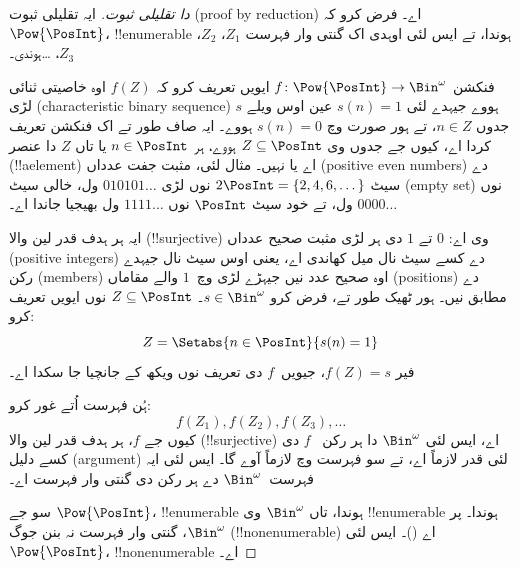 \documentclass[../../../include/open-logic-section]{subfiles}
\begin{document}
\begin{proof}[{} دا تقلیلی ثبوت]
ایہ تقلیلی ثبوت (proof by reduction) اے۔ فرض کرو کہ
$\Pow{\PosInt}$، !!{enumerable} ہوندا، تے ایس لئی اوہدی اک
گنتی وار فہرست $Z_{1}$، $Z_{2}$، $Z_{3}$، \dots ہوندی۔

فنکشن $f \colon \Pow{\PosInt} \to \Bin^\omega$ ایویں تعریف کرو کہ
$f(Z)$ اوہ خاصیتی ثنائی لڑی (characteristic binary sequence) $s$ ہووے
جیہدے لئی $s(n) = 1$ عین اوس ویلے جدوں
$n \in Z$، تے ہور صورت وچ $s(n) = 0$ ہووے۔
ایہ صاف طور تے اک فنکشن تعریف کردا اے، کیوں جے جدوں وی
$Z \subseteq \PosInt$ ہووے، ہر $n \in \PosInt$ یا تاں $Z$ دا
عنصر (!!a{element}) اے یا نہیں۔ مثال لئی، مثبت جفت عدداں (positive
even numbers) دے سیٹ
$2\PosInt = \{2, 4, 6, \dots\}$ نوں لڑی $010101\dots$ ول، خالی سیٹ
(empty set)
نوں $0000\dots$ ول، تے خود سیٹ $\PosInt$ نوں $1111\dots$ ول بھیجیا
جاندا اے۔

ایہ ہر ہدف قدر لین والا (!!{surjective}) وی اے: $0$ تے $1$ دی ہر لڑی
مثبت صحیح عدداں (positive integers) دے کسے سیٹ نال میل کھاندی اے،
یعنی اوس سیٹ نال جیہدے رکن (members) اوہ صحیح عدد نیں جیہڑے لڑی
وچ~$1$ والے مقاماں (positions) دے مطابق نیں۔ ہور ٹھیک طور تے،
فرض کرو $s \in \Bin^\omega$۔ $Z \subseteq \PosInt$ نوں ایویں تعریف کرو:
\[
Z = \Setabs{n \in \PosInt}{s(n) = 1}
\]
فیر $f(Z) = s$، جیویں~$f$ دی تعریف نوں ویکھ کے جانچیا جا سکدا اے۔

ہُن فہرست اُتے غور کرو:
\[
f(Z_1), f(Z_2), f(Z_3), \dots
\]
کیوں جے $f$، ہر ہدف قدر لین والا (!!{surjective}) اے، ایس لئی
$\Bin^\omega$ دا ہر رکن ~$f$ دی کسے دلیل (argument) لئی قدر لازماً اے،
تے سو فہرست وچ لازماً آوے گا۔
ایس لئی ایہ فہرست~$\Bin^\omega$ دے ہر رکن دی گنتی وار
فہرست اے۔

سو جے $\Pow{\PosInt}$، !!{enumerable} ہوندا، تاں $\Bin^\omega$ وی
!!{enumerable} ہوندا۔ پر $\Bin^\omega$، گنتی وار فہرست نہ بنن جوگ
(!!{nonenumerable}) اے
()۔ ایس لئی $\Pow{\PosInt}$،
!!{nonenumerable} اے۔
\end{proof}
\end{document}
